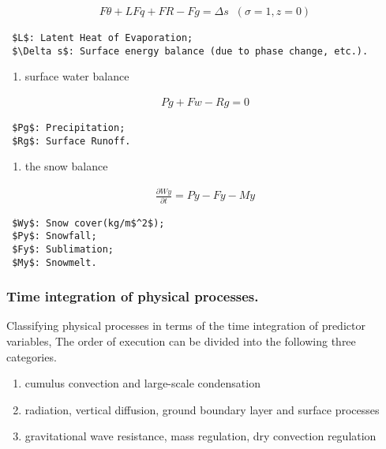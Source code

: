 \begin{eqnarray}
    F{\theta} + L F{q} + F{R} - F{g} = \Delta s \; \; (\sigma=1, z=0)
\end{eqnarray}

\begin{verbatim}
 $L$: Latent Heat of Evaporation;
 $\Delta s$: Surface energy balance (due to phase change, etc.).
\end{verbatim}

\begin{enumerate}
\def\labelenumi{\arabic{enumi}.}
\setcounter{enumi}{6}
\tightlist
\item
  surface water balance
\end{enumerate}

\begin{eqnarray}
  Pg + Fw - Rg = 0
\end{eqnarray}

\begin{verbatim}
 $Pg$: Precipitation;
 $Rg$: Surface Runoff.
\end{verbatim}

\begin{enumerate}
\def\labelenumi{\arabic{enumi}.}
\setcounter{enumi}{7}
\tightlist
\item
  the snow balance
\end{enumerate}

\begin{eqnarray}
  \frac{\partial Wy}{\partial t} = Py - Fy - My
\end{eqnarray}

\begin{verbatim}
 $Wy$: Snow cover(kg/m$^2$);
 $Py$: Snowfall;
 $Fy$: Sublimation;
 $My$: Snowmelt.
\end{verbatim}

\hypertarget{time-integration-of-physical-processes.}{%
\subsubsection{Time integration of physical
processes.}\label{time-integration-of-physical-processes.}}

Classifying physical processes in terms of the time integration of
predictor variables, The order of execution can be divided into the
following three categories.

\begin{enumerate}
\def\labelenumi{\arabic{enumi}.}
\item
  cumulus convection and large-scale condensation
\item
  radiation, vertical diffusion, ground boundary layer and surface
  processes
\item
  gravitational wave resistance, mass regulation, dry convection
  regulation
\end{enumerate}

